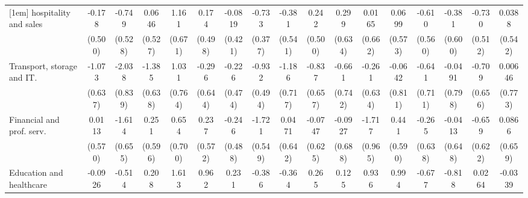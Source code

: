 {\begin{tabular}{l*{16}{c}}
[1em]
hospitality and sales&      -0.178         &      -0.749         &      0.0646         &       1.161         &       0.174         &     -0.0819         &      -0.733         &      -0.381         &       0.242         &       0.299         &      0.0165         &      0.0699         &      -0.610         &      -0.381         &      -0.730         &      0.0388         \\
                    &     (0.500)         &     (0.528)         &     (0.527)         &     (0.671)         &     (0.498)         &     (0.421)         &     (0.377)         &     (0.541)         &     (0.500)         &     (0.634)         &     (0.662)         &     (0.573)         &     (0.560)         &     (0.600)         &     (0.512)         &     (0.542)         \\
[1em]
Transport, storage and IT.&      -1.073         &      -2.038\sym{*}  &      -1.385\sym{*}  &       1.031         &      -0.296         &      -0.226         &      -0.932         &      -1.186         &      -0.837         &      -0.661         &      -0.261         &     -0.0642         &      -0.641         &     -0.0491         &      -0.709         &     0.00646         \\
                    &     (0.637)         &     (0.839)         &     (0.638)         &     (0.764)         &     (0.644)         &     (0.474)         &     (0.494)         &     (0.717)         &     (0.657)         &     (0.742)         &     (0.634)         &     (0.811)         &     (0.711)         &     (0.798)         &     (0.656)         &     (0.773)         \\
[1em]
Financial and prof. serv.&      0.0113         &      -1.614\sym{*}  &       0.251         &       0.654         &       0.237         &      -0.246         &      -1.721\sym{**} &      0.0471         &     -0.0747         &     -0.0927         &      -1.717         &       0.441         &      -0.265         &     -0.0413         &      -0.659         &      0.0866         \\
                    &     (0.570)         &     (0.655)         &     (0.596)         &     (0.700)         &     (0.572)         &     (0.488)         &     (0.549)         &     (0.642)         &     (0.625)         &     (0.688)         &     (0.965)         &     (0.590)         &     (0.638)         &     (0.648)         &     (0.622)         &     (0.659)         \\
[1em]
Education and healthcare&     -0.0926         &      -0.514         &       0.208         &       1.613\sym{*}  &       0.962         &       0.231         &      -0.386         &      -0.364         &       0.265         &       0.125         &       0.936         &       0.994         &      -0.677         &      -0.818         &      0.0264         &     -0.0339         \\

\end{tabular}}
